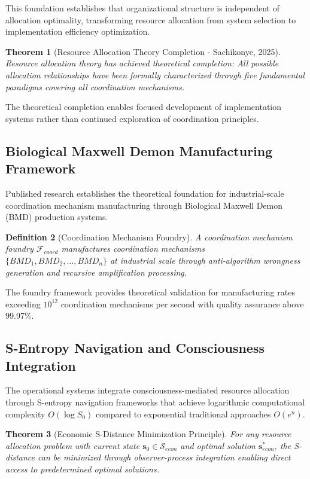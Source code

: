 \documentclass[12pt,a4paper]{article}
\newtheorem{theorem}{Theorem}[section]
\newtheorem{definition}[theorem]{Definition}
\begin{document}
This foundation establishes that organizational structure is independent of allocation optimality, transforming resource allocation from system selection to implementation efficiency optimization.

\begin{theorem}[Resource Allocation Theory Completion - Sachikonye, 2025]
Resource allocation theory has achieved theoretical completion: All possible allocation relationships have been formally characterized through five fundamental paradigms covering all coordination mechanisms.
\end{theorem}

The theoretical completion enables focused development of implementation systems rather than continued exploration of coordination principles.

\subsection{Biological Maxwell Demon Manufacturing Framework}

Published research establishes the theoretical foundation for industrial-scale coordination mechanism manufacturing through Biological Maxwell Demon (BMD) production systems.

\begin{definition}[Coordination Mechanism Foundry]
A coordination mechanism foundry $\mathcal{F}_{coord}$ manufactures coordination mechanisms $\{BMD_1, BMD_2, \ldots, BMD_n\}$ at industrial scale through anti-algorithm wrongness generation and recursive amplification processing.
\end{definition}

The foundry framework provides theoretical validation for manufacturing rates exceeding $10^{12}$ coordination mechanisms per second with quality assurance above 99.97\%.

\subsection{S-Entropy Navigation and Consciousness Integration}

The operational systems integrate consciousness-mediated resource allocation through S-entropy navigation frameworks that achieve logarithmic computational complexity $O(\log S_0)$ compared to exponential traditional approaches $O(e^n)$.

\begin{theorem}[Economic S-Distance Minimization Principle]
For any resource allocation problem with current state $\mathbf{s}_0 \in \mathcal{S}_{econ}$ and optimal solution $\mathbf{s}^*_{econ}$, the S-distance can be minimized through observer-process integration enabling direct access to predetermined optimal solutions.
\end{theorem}
\end{document}
